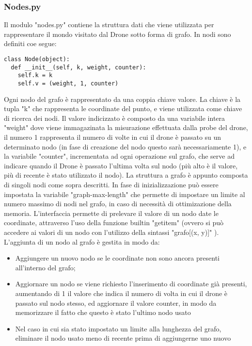 \subsubsection{Nodes.py}
Il modulo "nodes.py" contiene la struttura dati che viene utilizzata per rappresentare il mondo visitato dal Drone sotto forma di grafo. In nodi sono definiti coe segue:
\begin{verbatim} 
class Node(object):
  def __init__(self, k, weight, counter):
    self.k = k
    self.v = (weight, 1, counter)
\end{verbatim}
Ogni nodo del grafo è rappresentato da una coppia chiave valore. La chiave è la tupla "k" che rappresenta le coordinate del punto, e viene utilizzata come chiave di ricerca dei nodi. Il valore indicizzato è composto da una variabile intera "weight" dove viene immagazinata la misurazione effettuata dalla probe del drone, il numero 1 rappresenta il numero di volte in cui il drone è passato su un determinato nodo (in fase di creazione del nodo questo sarà necessariamente 1), e la variabile "counter", incrementata ad ogni operazione sul grafo, che serve ad indicare quando il Drone è passato l'ultima volta sul nodo (più alto è il valore, più di recente è stato utilizzato il nodo). 
La struttura a grafo è appunto composta di singoli nodi come sopra descritti. In fase di inizializzazione può essere impostata la variabile "graph-max-length" che permette di impostare un limite al numero massimo di nodi nel grafo, in caso di necessità di ottimizazione della memoria. L'interfaccia permette di prelevare il valore di un nodo date le coordinate, attraverso l'uso della funzione builtin "getitem" (ovvero si può accedere ai valori di un nodo con l'utilizzo della sintassi "grafo[(x, y)]" ). L'aggiunta di un nodo al grafo è gestita in modo da:
\begin{itemize}
\item Aggiungere un nuovo nodo se le coordinate non sono ancora presenti all'interno del grafo;

\item Aggiornare un nodo se viene richiesto l'inserimento di coordinate già presenti, aumentando di 1 il valore che indica il numero di volta in cui il drone è passato sul nodo stesso, ed aggiornare il valore counter, in modo da memorizzare il fatto che questo è stato l'ultimo nodo usato

\item Nel caso in cui sia stato impostato un limite alla lunghezza del grafo, eliminare il nodo usato meno di recente prima di aggiungerne uno nuovo
\end{itemize}
